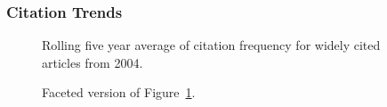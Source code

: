 \documentclass[
  10pt,
  letterpaper,
  DIV=11,
  numbers=noendperiod,
  twoside]{scrartcl}
\begin{document}
\subsubsection*{Citation Trends}\label{citation-trends-28}

\begin{figure}


\caption{\label{fig-citation-spaghetti-2004}Rolling five year average of
citation frequency for widely cited articles from 2004.}

\end{figure}%

\begin{figure}


\caption{\label{fig-citation-facet-2004}Faceted version of
Figure~\ref{fig-citation-spaghetti-2004}.}

\end{figure}%
\end{document}
